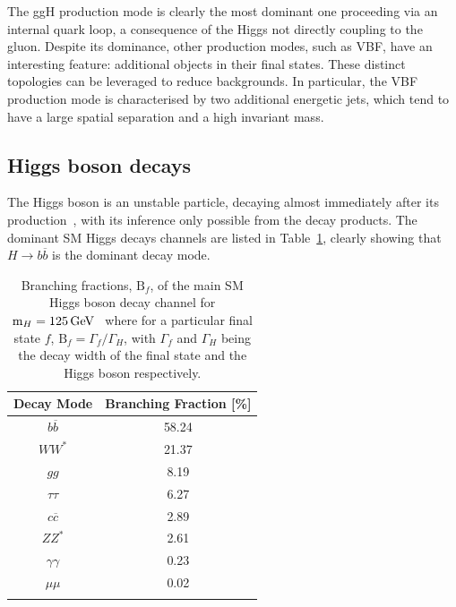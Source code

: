 The ggH production mode is clearly the most dominant one proceeding via an internal quark loop, a consequence of the Higgs not directly coupling to the gluon. Despite its dominance, other production modes, such as VBF, have an interesting feature: additional objects in their final states. These distinct topologies can be leveraged to reduce backgrounds. In particular, the VBF production mode is characterised by two additional energetic jets, which tend to have a large spatial separation and a high invariant mass.

\newpage
\subsection{Higgs boson decays}

The Higgs boson is an unstable particle, decaying almost immediately after its production~\cite{MarkThompson}, with its inference only possible from the decay products. The dominant SM Higgs decays channels are listed in Table~\ref{Table:Introduction_HiggsBranchingFractions}, clearly showing that $H\rightarrow b\overline{b}$ is the dominant decay mode. 

\begin{table}[h]
\centering
\renewcommand{\arraystretch}{1.5} %
\setlength{\tabcolsep}{12pt} %
\begin{tabular}{|c|c|}
\hline
Decay Mode                  & Branching Fraction {[}\%{]} \\ \hline \hline
$b\overline{b}$             & 58.24 \\ 
\arrayrulecolor{lightgray} \hline
$WW^*$                      & 21.37 \\ 
\arrayrulecolor{lightgray} \hline
$gg$                        & 8.19  \\ 
\arrayrulecolor{lightgray} \hline
$\tau\tau$                  & 6.27  \\ 
\arrayrulecolor{lightgray} \hline
$c\overline{c}$             & 2.89  \\ 
\arrayrulecolor{lightgray} \hline
$ZZ^*$                      & 2.61  \\ 
\arrayrulecolor{lightgray} \hline
$\gamma\gamma$              & 0.23  \\ 
\arrayrulecolor{lightgray} \hline
$\mu\mu$                    & 0.02  \\ 
\arrayrulecolor{black} \hline
\end{tabular}
\caption{Branching fractions, $\text{B}_f$, of the main SM Higgs boson decay channel for $\text{m}_H = 125\,\text{Ge\hspace{-.08em}V}$~\cite{HiggsProduction_XS_13TeV,HiggsProduction_XS_13p6TeV} where for a particular final state $f$, $\text{B}_f = \Gamma_f/\Gamma_H$, with $\Gamma_f$ and $\Gamma_H$ being the decay width of the final state and the Higgs boson respectively.}
\label{Table:Introduction_HiggsBranchingFractions}
\end{table}


